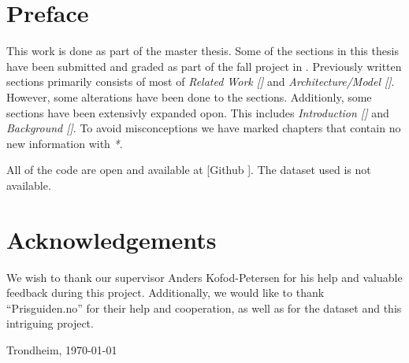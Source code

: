 \section*{Preface}



\vspace{1cm}

This work is done as part of the master thesis.
Some of the sections in this thesis have been submitted and graded
as part of the fall project in \cite{Sivertsen2021}.
Previously written sections primarily consists of most of
\textit{Related Work []} and \textit{Architecture/Model []}.
However, some alterations have been done to the sections.
Additionly, some sections have been extensivly expanded opon.
This includes \textit{Introduction [] } and
\textit{Background []}.
To avoid misconceptions we have marked chapters that contain no new
information with \textit{*}.


All of the code are open and available at [Github \cite{githubSource}]. The dataset used is not available.


\section{Acknowledgements}
We wish to thank our supervisor Anders Kofod-Petersen for his help and valuable feedback during this project.
Additionally, we would like to thank ``Prisguiden.no'' for their help and cooperation,
as well as for the dataset and this intriguing project.


\vfill

\hfill \thesisAuthor

\hfill Trondheim, \today